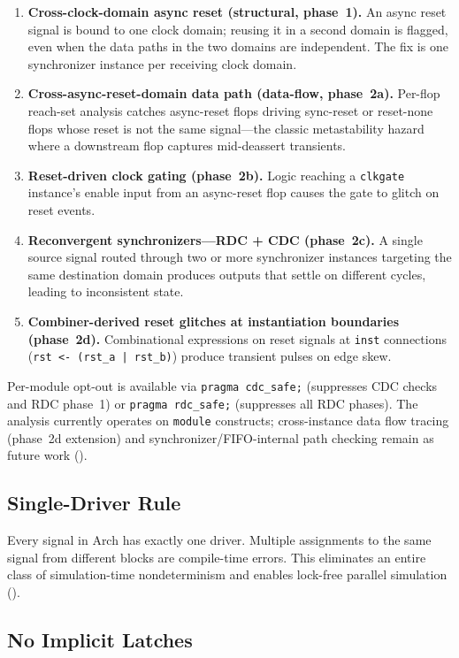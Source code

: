 \documentclass[manuscript]{acmart}
\begin{document}
\begin{enumerate}[leftmargin=*,nosep]
\item \textbf{Cross-clock-domain async reset (structural, phase~1).} An async reset signal is bound to one clock domain; reusing it in a second domain is flagged, even when the data paths in the two domains are independent. The fix is one synchronizer instance per receiving clock domain.
\item \textbf{Cross-async-reset-domain data path (data-flow, phase~2a).} Per-flop reach-set analysis catches async-reset flops driving sync-reset or reset-none flops whose reset is not the same signal---the classic metastability hazard where a downstream flop captures mid-deassert transients.
\item \textbf{Reset-driven clock gating (phase~2b).} Logic reaching a \texttt{clkgate} instance's enable input from an async-reset flop causes the gate to glitch on reset events.
\item \textbf{Reconvergent synchronizers---RDC + CDC (phase~2c).} A single source signal routed through two or more synchronizer instances targeting the same destination domain produces outputs that settle on different cycles, leading to inconsistent state.
\item \textbf{Combiner-derived reset glitches at instantiation boundaries (phase~2d).} Combinational expressions on reset signals at \texttt{inst} connections (\texttt{rst <- (rst\_a | rst\_b)}) produce transient pulses on edge skew.
\end{enumerate}

Per-module opt-out is available via \texttt{pragma cdc\_safe;} (suppresses CDC checks and RDC phase~1) or \texttt{pragma rdc\_safe;} (suppresses all RDC phases). The analysis currently operates on \texttt{module} constructs; cross-instance data flow tracing (phase~2d extension) and synchronizer/FIFO-internal path checking remain as future work ().

\subsection{Single-Driver Rule}

Every signal in Arch has exactly one driver. Multiple assignments to the same signal from different blocks are compile-time errors. This eliminates an entire class of simulation-time nondeterminism and enables lock-free parallel simulation ().

\subsection{No Implicit Latches}
\end{document}
